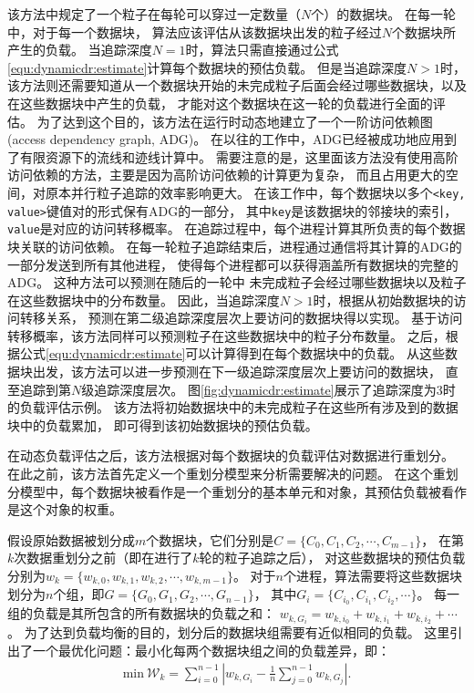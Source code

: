 该方法中规定了一个粒子在每轮可以穿过一定数量（$N$个）的数据块。
在每一轮中，对于每一个数据块，%
算法应该评估从该数据块出发的粒子经过$N$个数据块所产生的负载。
当追踪深度$N=1$时，算法只需直接通过公式\ref{equ:dynamicdr:estimate}计算每个数据块的预估负载。
但是当追踪深度$N>1$时，
该方法则还需要知道从一个数据块开始的未完成粒子后面会经过哪些数据块，以及在这些数据块中产生的负载，
才能对这个数据块在这一轮的负载进行全面的评估。
为了达到这个目的，该方法在运行时动态地建立了一个一阶访问依赖图(access dependency graph, ADG)。
在以往的工作中，ADG已经被成功地应用到了有限资源下的流线和迹线计算中\parencite{ChenXLS12,ChenNLS12}。
需要注意的是，这里面该方法没有使用高阶访问依赖的方法，主要是因为高阶访问依赖的计算更为复杂，
而且占用更大的空间，对原本并行粒子追踪的效率影响更大。
在该工作中，每个数据块以多个\texttt{<key, value>}键值对的形式保有ADG的一部分，
其中\texttt{key}是该数据块的邻接块的索引，\texttt{value}是对应的访问转移概率。
在追踪过程中，每个进程计算其所负责的每个数据块关联的访问依赖。
在每一轮粒子追踪结束后，进程通过通信将其计算的ADG的一部分发送到所有其他进程，
使得每个进程都可以获得涵盖所有数据块的完整的ADG。
这种方法可以预测在随后的一轮中
未完成粒子会经过哪些数据块以及粒子在这些数据块中的分布数量。
因此，当追踪深度$N>1$时，根据从初始数据块的访问转移关系，
预测在第二级追踪深度层次上要访问的数据块得以实现。
基于访问转移概率，该方法同样可以预测粒子在这些数据块中的粒子分布数量。
之后，根据公式\ref{equ:dynamicdr:estimate}可以计算得到在每个数据块中的负载。
从这些数据块出发，该方法可以进一步预测在下一级追踪深度层次上要访问的数据块，
直至追踪到第$N$级追踪深度层次。
图\ref{fig:dynamicdr:estimate}展示了追踪深度为3时的负载评估示例。
该方法将初始数据块中的未完成粒子在这些所有涉及到的数据块中的负载累加，
即可得到该初始数据块的预估负载。

在动态负载评估之后，该方法根据对每个数据块的负载评估对数据进行重划分。
在此之前，该方法首先定义一个重划分模型来分析需要解决的问题。
在这个重划分模型中，每个数据块被看作是一个重划分的基本单元和对象，其预估负载被看作是这个对象的权重。

假设原始数据被划分成$m$个数据块，它们分别是$C = \{C_0, C_1, C_2, \cdots, C_{m-1}\}$，
在第$k$次数据重划分之前（即在进行了$k$轮的粒子追踪之后），
对这些数据块的预估负载分别为$w_{k} = \{w_{k,0}, w_{k,1}, w_{k,2}, \cdots, w_{k,m-1}\}$。
对于$n$个进程，算法需要将这些数据块划分为$n$个组，即$G = \{G_0, G_1, G_2, \cdots, G_{n-1}\}$，
其中$G_i = \{C_{i_0}, C_{i_1}, C_{i_2}, \cdots\}$。
每一组的负载是其所包含的所有数据块的负载之和：
$w_{k,{G_i}} = w_{k,{i_0}} + w_{k,{i_1}} + w_{k,{i_2}} + \cdots$。
为了达到负载均衡的目的，划分后的数据块组需要有近似相同的负载。
这里引出了一个最优化问题：最小化每两个数据块组之间的负载差异，即：
\begin{equation}
\label{eqt:dynamicdr:optimization}
\begin{aligned}
  \textrm{min}\ \mathcal{W}_k = \sum_{i=0}^{n-1}\left|w_{k,{G_i}} - \frac{1}{n}\sum_{j=0}^{n-1}w_{k,{G_j}}\right|.
\end{aligned}
\end{equation}

